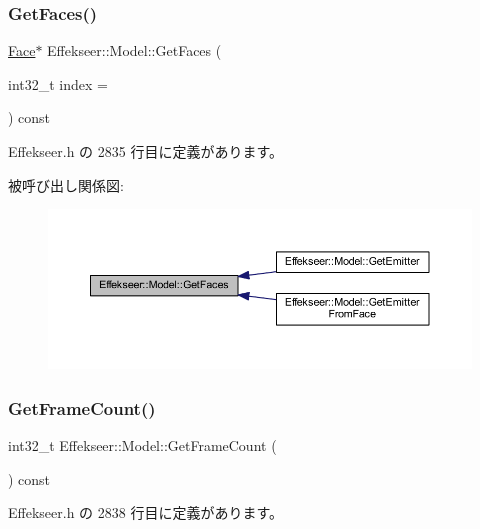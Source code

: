\subsubsection{\texorpdfstring{Get\+Faces()}{GetFaces()}}
{\footnotesize\ttfamily \mbox{\hyperlink{struct_effekseer_1_1_model_1_1_face}{Face}}$\ast$ Effekseer\+::\+Model\+::\+Get\+Faces (\begin{DoxyParamCaption}\item[{int32\+\_\+t}]{index = {} }\end{DoxyParamCaption}) const\hspace{0.3cm}{\ttfamily [inline]}}



 Effekseer.\+h の 2835 行目に定義があります。

被呼び出し関係図\+:\nopagebreak
\begin{figure}[H]
\begin{center}
\leavevmode
\includegraphics[width=350pt]{class_effekseer_1_1_model_aca53194432e229643e98ecfd9b3d9db9_icgraph}
\end{center}
\end{figure}
\mbox{\label{class_effekseer_1_1_model_a7d4897bc5dffe71d6814a99b32b57c16}} 
\subsubsection{\texorpdfstring{Get\+Frame\+Count()}{GetFrameCount()}}
{\footnotesize\ttfamily int32\+\_\+t Effekseer\+::\+Model\+::\+Get\+Frame\+Count (\begin{DoxyParamCaption}{ }\end{DoxyParamCaption}) const\hspace{0.3cm}{\ttfamily [inline]}}



 Effekseer.\+h の 2838 行目に定義があります。

